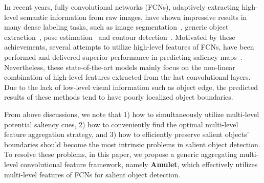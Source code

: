 \documentclass[10pt,twocolumn,letterpaper]{article}
\begin{document}
In recent years, fully convolutional networks (FCNs), adaptively extracting high-level semantic information from raw images, have shown impressive results in many dense labeling tasks, such as image segmentation~\cite{long2015fully,noh2015learning,dai2016instance}, generic object extraction~\cite{li2016r,hariharan2015hypercolumns}, pose estimation~\cite{yang2016end} and contour detection~\cite{xie2015holistically}.
%
Motivated by these achievements, several attempts to utilize high-level features of FCNs, have been performed and delivered superior performance in predicting saliency maps~\cite{lee2016deep,li2015visual,liu2016dhsnet,wang2015deep,zhao2015saliency}.
%
Nevertheless, these state-of-the-art models mainly focus on the non-linear combination of high-level features extracted from the last convolutional layers.
%
Due to the lack of low-level visual information such as object edge, the predicted results of these methods tend to have poorly localized object boundaries.

From above discussions, we note that 1) how to simultaneously utilize multi-level potential saliency cues, 2) how to conveniently find the optimal multi-level feature aggregation strategy, and 3) how to efficiently preserve salient objects' boundaries should become the most intrinsic problems in salient object detection.
%
To resolve these problems, in this paper, we propose a generic aggregating multi-level convolutional feature framework, namely \textbf{Amulet}, which effectively utilizes multi-level features of FCNs for salient object detection.
%
\end{document}
